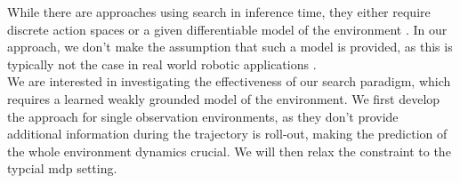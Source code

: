 While there are approaches using search in inference time, they either require discrete action spaces \cite{MUZero} or a given differentiable model of the environment \cite{Lee_Jeon_Kim_Kim_2020}. 
In our approach, we 
don't make the assumption that such a model is provided, as this is typically not the case in real world robotic applications   .\\

We are interested in investigating the effectiveness of our search paradigm, which requires a learned weakly grounded model of the environment. We first develop the approach 
for single observation environments, 
as they don't provide additional information during the trajectory is roll-out, making the prediction of the whole environment dynamics crucial. We will then relax the constraint to the typcial 
\ac{mdp} setting.